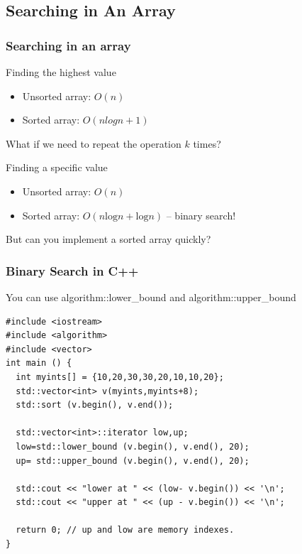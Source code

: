 \documentclass{beamer}
\begin{document}
\subsection{Searching in An Array}
\begin{frame}
  \frametitle{Searching in an array}

  \begin{block}{Finding the highest value}
    \begin{itemize}
    \item Unsorted array: $O(n)$
    \item Sorted array: $O(nlogn + 1)$
    \end{itemize}
    What if we need to repeat the operation $k$ times?
  \end{block}

  \begin{block}{Finding a specific value}
    \begin{itemize}
    \item Unsorted array: $O(n)$
    \item Sorted array: $O(n\text{log}n + \text{log}n)$ -- binary search!
    \end{itemize}
  \end{block}

  But can you implement a sorted array quickly?
\end{frame}



\begin{frame}
  \frametitle{Binary Search in C++}
  
  {\small You can use algorithm::lower\_bound and algorithm::upper\_bound
  
 
  \begin{block}{}
\begin{verbatim} 
#include <iostream>     
#include <algorithm>    
#include <vector>       
int main () {
  int myints[] = {10,20,30,30,20,10,10,20};
  std::vector<int> v(myints,myints+8);           
  std::sort (v.begin(), v.end());                

  std::vector<int>::iterator low,up;
  low=std::lower_bound (v.begin(), v.end(), 20); 
  up= std::upper_bound (v.begin(), v.end(), 20); 

  std::cout << "lower at " << (low- v.begin()) << '\n';
  std::cout << "upper at " << (up - v.begin()) << '\n';

  return 0; // up and low are memory indexes.
}
\end{verbatim}
    \end{block}
}

\end{frame}
\end{document}
